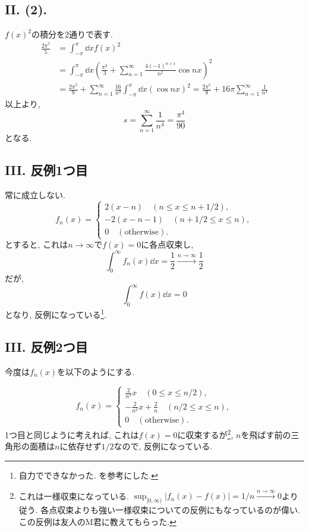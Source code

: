 \subsection*{II. (2). }
$f(x)^2$の積分を2通りで表す. 
\begin{align*}
  \frac{2\pi^5}{5}
  &=\int_{-\pi}^{\pi}\dd{x}f(x)^2\\
  &=\int_{-\pi}^{\pi}\dd{x}\left( \frac{\pi^2}{3}+ \sum_{n=1}^{\infty}\frac{4(-1)^{n+1}}{n^2}\cos{nx}\right)^2\\
  &=\frac{2\pi^5}{9}+\sum_{n=1}^{\infty}\frac{16}{n^4}\int_{-\pi}^{\pi}\dd{x}(\cos{nx})^2=\frac{2\pi^5}{9}+16\pi\sum_{n=1}^{\infty}\frac{1}{n^4}
\end{align*}
以上より, 
\begin{equation}
  s=\sum_{n=1}^{\infty}\frac{1}{n^4}=\frac{\pi^4}{90}
\end{equation}
となる. 

\subsection*{III. 反例1つ目}
常に成立しない. 
\begin{equation}
  f_n(x)=\begin{cases}
    2(x-n)\quad (n\leq x\leq n+1/2), \\
    -2(x-n-1)\quad (n+1/2\leq x\leq n), \\
    0\quad (\text{otherwise}). 
  \end{cases}
\end{equation}
とすると, これは$n\to\infty$で$f(x)=0$に各点収束し, 
\begin{equation}
  \int_{0}^{\infty}f_n(x)\dd{x}=\frac{1}{2}\xrightarrow{n\to\infty}\frac{1}{2}
\end{equation}
だが, 
\begin{equation}
  \int_{0}^{\infty}f(x)\dd{x}=0
\end{equation}
となり, 反例になっている\footnote{自力でできなかった. \cite{kyokugensekibun}を参考にした. }.

\subsection*{III. 反例2つ目}
今度は$f_n(x)$を以下のようにする. 

\begin{equation}
  f_n(x)=\begin{cases}
    \frac{2}{n^2}x\quad (0\leq x\leq n/2), \\
    -\frac{2}{n^2}x+\frac{2}{n}\quad (n/2\leq x\leq n), \\
    0\quad (\text{otherwise}). 
  \end{cases}
\end{equation}
1つ目と同じように考えれば, これは$f(x)=0$に収束するが\footnote{これは一様収束になっている. $\sup_{[0, \infty)}|f_n(x)-f(x)|=1/n\xrightarrow{n\to\infty} 0$より従う. 各点収束よりも強い一様収束についての反例にもなっているのが偉い. この反例は友人のM君に教えてもらった. }, $n$を飛ばす前の三角形の面積は$n$に依存せず$1/2$なので, 反例になっている. 


